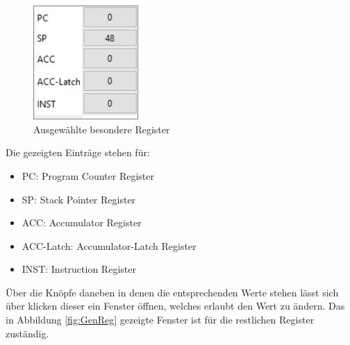 \documentclass[12pt]{article}
\newcommand{\imgSpaceBefore}{\vspace{10pt}}
\begin{document}
\begin{figure}[h]
\centering
\includegraphics[width=4cm]{bilder/Register}
\caption{Ausgewählte besondere Register}
\label{fig:Register}
\end{figure}

\noindent
Die gezeigten Einträge stehen für:\imgSpaceBefore

\begin{itemize}
	\item PC: Program Counter Register
	\item SP: Stack Pointer Register
	\item ACC: Accumulator Register
	\item ACC-Latch: Accumulator-Latch Register
	\item INST: Instruction Register
\end{itemize}

\noindent
Über die Knöpfe daneben in denen die entsprechenden Werte stehen lässt sich über klicken dieser ein Fenster öffnen, welches erlaubt den Wert zu ändern.
Das in Abbildung \ref{fig:GenReg} gezeigte Fenster ist für die restlichen Register zuständig.\imgSpaceBefore
\end{document}
